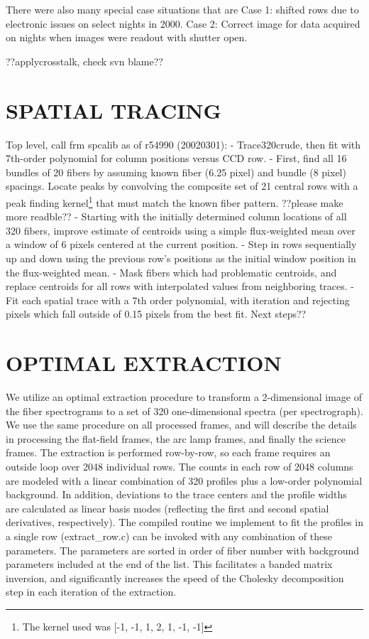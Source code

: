 \documentclass[12pt,preprint]{aastex}
\begin{document}
There were also many special case situations that are 
Case 1:  shifted rows due to electronic issues on select nights in 2000.
Case 2:  Correct image for data acquired on nights when images were readout with shutter open.

??applycrosstalk, check svn blame??


\section{SPATIAL TRACING}
\label{sec_tracing}

Top level, call frm spcalib as of r54990 (20020301):  
 - Trace320crude, then fit with 7th-order polynomial for column positions versus CCD row.
 - First, find all 16 bundles of 20 fibers by assuming known fiber (6.25 pixel)
and bundle (8 pixel) spacings.  Locate peaks by convolving the composite set of 21 central rows with a peak finding kernel\footnote{The kernel used was [-1, -1, 1, 2, 1, -1, -1]} that must match the known fiber pattern. ??please make more readble??
 - Starting with the initially determined column locations of all 320 fibers, 
improve estimate of centroids using a simple flux-weighted mean over a window of 6 pixels centered at the current position.  
 - Step in rows sequentially up and down using the previous row's positions as the initial window position in the flux-weighted mean.
 - Mask fibers which had problematic centroids, and replace centroids for all rows with interpolated values from neighboring traces.
 - Fit each spatial trace with a 7th order polynomial, with iteration and rejecting pixels which fall outside of 0.15 pixels from the best fit.
Next steps??


\section{OPTIMAL EXTRACTION}
\label{sec_extract}

We utilize an optimal extraction procedure to transform a 2-dimensional image of
the fiber spectrograms to a set of 320 one-dimensional spectra 
(per spectrograph).  We use the same procedure on all processed frames, 
and will describe the details in processing the flat-field frames, the
arc lamp frames, and finally the science frames.  
The extraction is performed row-by-row, so each frame requires an 
outside loop over 2048 individual rows.
The counts in each row of 2048 columns are modeled with a linear 
combination of 320 profiles plus a low-order
polynomial background.  In addition, deviations to the trace centers and
the profile widths are calculated as linear basis modes (reflecting the first
and second spatial derivatives, respectively).  The compiled routine
we implement to fit the profiles in a single row (extract\_row.c) can
be invoked with any combination of these parameters.  The parameters are
sorted in order of fiber number with background parameters included at the
end of the list.  This facilitates a banded matrix inversion, and 
significantly increases the speed of the Cholesky decomposition step in each
iteration of the extraction.
\end{document}
